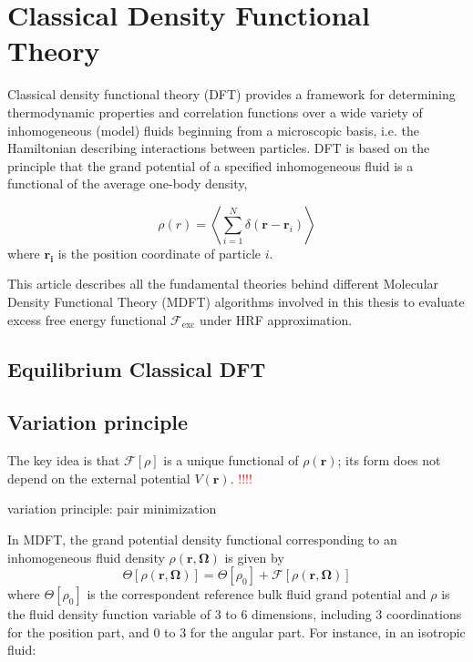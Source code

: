 
\chapter{Classical Density Functional Theory\label{chpt:mdft}}

Classical density functional theory (DFT) provides a framework for determining
thermodynamic properties and correlation functions over a wide variety
of inhomogeneous (model) fluids beginning from a microscopic basis,
i.e. the Hamiltonian describing interactions between particles. DFT
is based on the principle that the grand potential of a specified inhomogeneous
fluid is a functional of the average one-body density,

\[
\rho(r)=\left\langle \sum_{i=1}^{N}\delta(\mathbf{r}-\mathbf{r}_{i})\right\rangle 
\]
where $\mathbf{r_{i}}$ is the position coordinate of particle $i$.

This article describes all the fundamental theories behind different Molecular Density Functional Theory (MDFT) 
algorithms involved in this thesis to evaluate excess free energy
functional $\mathcal{F}_{\mathrm{exc}}$ under HRF approximation.


\section{Equilibrium Classical DFT}


\section{Variation principle}

The key idea is that $\mathcal{F}[\rho]$ is a unique functional of
$\rho(\mathbf{r})$; its form does not depend on the external potential
$V(\mathbf{r})$. \textcolor{red}{!!!!}

variation principle: pair minimization

In \acf{MDFT}, the grand potential density functional corresponding
to an inhomogeneous fluid density $\rho(\mathbf{r},\mathbf{\Omega})$
is given by 
\begin{equation}
\Theta[\rho(\mathbf{r},\mathbf{\Omega})]=\Theta[\rho_{0}]+\mathcal{F}[\rho(\mathbf{r},\mathbf{\Omega})]
\end{equation}
where $\Theta[\rho_{0}]$ is the correspondent reference bulk fluid
grand potential and $\rho$ is the fluid density function variable
of 3 to 6 dimensions, including 3 coordinations for the position part,
and 0 to 3 for the angular part. For instance, in an isotropic fluid: 

